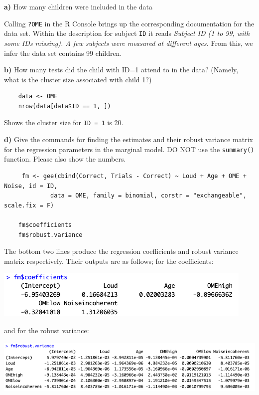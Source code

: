 \documentclass{article}
\newcommand\questionbox[1]{%
  \begin{Qbox}#1\end{Qbox}}
\begin{document}
\questionbox{\textbf{a)} How many children were included in the data}

Calling \texttt{?OME} in the R Console brings up the corresponding documentation for the data set. Within the description for subject \texttt{ID} it reads \textit{Subject ID (1 to 99, with some IDs missing). A few subjects were measured at different ages.} From this, we infer the data set contains 99 children.

\questionbox{\textbf{b)}  How many tests did the child with ID=1 attend to in the data? (Namely, what is the cluster size associated with child 1?) }
\begin{verbatim}
    data <- OME
    nrow(data[data$ID == 1, ])
\end{verbatim}
Shows the cluster size for \texttt{ID = 1} is 20.

\questionbox{\textbf{d)}  Give the commands for finding the estimates and their robust variance matrix for the regression parameters in the marginal model. DO NOT use the \texttt{summary()} function. Please also show the numbers.}
\begin{verbatim}
     fm <- gee(cbind(Correct, Trials - Correct) ~ Loud + Age + OME + Noise, id = ID,
             data = OME, family = binomial, corstr = "exchangeable", scale.fix = F)

    fm$coefficients
    fm$robust.variance
\end{verbatim}
The bottom two lines produce the regression coefficients and robust variance matrix respectively. Their outputs are as follows; for the coefficients:
\begin{center}
    \includegraphics[scale=0.5]{glm-notes/Assignments/assignment-imgs/coefs.png}
\end{center}
and for the robust variance:
\begin{center}
    \includegraphics[scale=0.5]{glm-notes/Assignments/assignment-imgs/robustvar.png}
\end{center}
\end{document}

